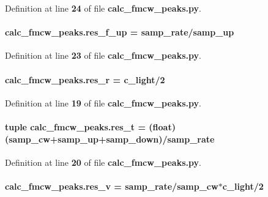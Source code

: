 Definition at line {\bf 24} of file {\bf calc\+\_\+fmcw\+\_\+peaks.\+py}.

\paragraph[{res\+\_\+f\+\_\+up}]{\setlength{\rightskip}{0pt plus 5cm}calc\+\_\+fmcw\+\_\+peaks.\+res\+\_\+f\+\_\+up = {\bf samp\+\_\+rate}/{\bf samp\+\_\+up}}\label{namespacecalc__fmcw__peaks_ada486996733761dfd9a265f5c807f1ad}


Definition at line {\bf 23} of file {\bf calc\+\_\+fmcw\+\_\+peaks.\+py}.

\paragraph[{res\+\_\+r}]{ calc\+\_\+fmcw\+\_\+peaks.\+res\+\_\+r = {\bf c\+\_\+light}/2}\label{namespacecalc__fmcw__peaks_a01df5ea9f7333d6a338b03224ddf2a5e}


Definition at line {\bf 19} of file {\bf calc\+\_\+fmcw\+\_\+peaks.\+py}.

\paragraph[{res\+\_\+t}]{\setlength{\rightskip}{0pt plus 5cm}tuple calc\+\_\+fmcw\+\_\+peaks.\+res\+\_\+t = (float)({\bf samp\+\_\+cw}+{\bf samp\+\_\+up}+{\bf samp\+\_\+down})/{\bf samp\+\_\+rate}}\label{namespacecalc__fmcw__peaks_a821c1788a984d6dce0f7f06e512474ba}


Definition at line {\bf 20} of file {\bf calc\+\_\+fmcw\+\_\+peaks.\+py}.

\paragraph[{res\+\_\+v}]{ calc\+\_\+fmcw\+\_\+peaks.\+res\+\_\+v = {\bf samp\+\_\+rate}/{\bf samp\+\_\+cw}$\ast${\bf c\+\_\+light}/2}\label{namespacecalc__fmcw__peaks_a535f34c9915b4d0addbd7f660e99a015}



